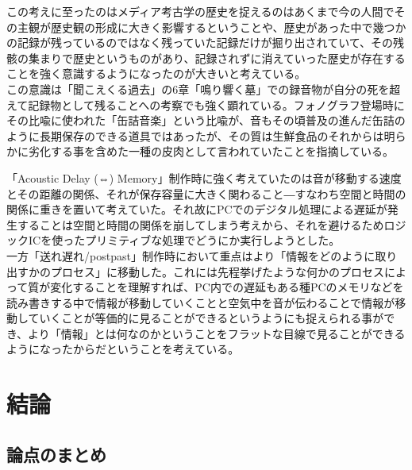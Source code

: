 \documentclass[a4paper,report]{jsbook}
\begin{document}
この考えに至ったのはメディア考古学の歴史を捉えるのはあくまで今の人間でその主観が歴史観の形成に大きく影響するということや、歴史があった中で幾つかの記録が残っているのではなく残っていた記録だけが掘り出されていて、その残骸の集まりで歴史というものがあり、記録されずに消えていった歴史が存在することを強く意識するようになったのが大きいと考えている。\\
この意識は「聞こえくる過去」の6章「鳴り響く墓」での録音物が自分の死を超えて記録物として残ることへの考察でも強く顕れている。フォノグラフ登場時にその比喩に使われた「缶詰音楽」という比喩が、音もその頃普及の進んだ缶詰のように長期保存のできる道具ではあったが、その質は生鮮食品のそれからは明らかに劣化する事を含めた一種の皮肉として言われていたことを指摘している。

「Acoustic Delay (⇔)
Memory」制作時に強く考えていたのは音が移動する速度とその距離の関係、それが保存容量に大きく関わること―すなわち空間と時間の関係に重きを置いて考えていた。それ故にPCでのデジタル処理による遅延が発生することは空間と時間の関係を崩してしまう考えから、それを避けるためロジックICを使ったプリミティブな処理でどうにか実行しようとした。\\
一方「送れ\textbar{}遅れ/post\textbar{}past」制作時において重点はより「情報をどのように取り出すかのプロセス」に移動した。これには先程挙げたような何かのプロセスによって質が変化することを理解すれば、PC内での遅延もある種PCのメモリなどを読み書きする中で情報が移動していくことと空気中を音が伝わることで情報が移動していくことが等価的に見ることができるというようにも捉えられる事ができ、より「情報」とは何なのかということをフラットな目線で見ることができるようになったからだということを考えている。

\chapter{結論}\label{ux7d50ux8ad6}

\section{論点のまとめ}\label{ux8ad6ux70b9ux306eux307eux3068ux3081}
\end{document}

